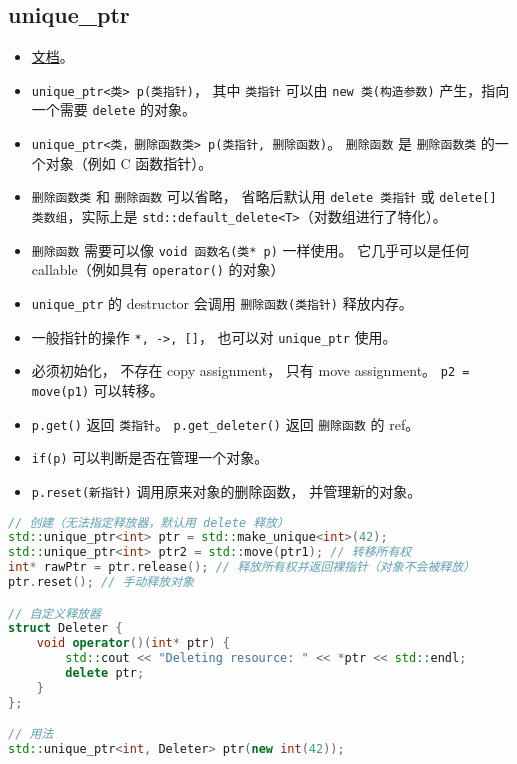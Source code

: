 
\begin{issues}
\issueDraft
\end{issues}

\subsection{unique\_ptr}
\begin{itemize}
\item \href{https://en.cppreference.com/w/cpp/memory/unique_ptr}{文档}。
\item \verb`unique_ptr<类> p(类指针)`， 其中 \verb`类指针` 可以由 \verb`new 类(构造参数)` 产生，指向一个需要 \verb`delete` 的对象。
\item \verb`unique_ptr<类，删除函数类> p(类指针, 删除函数)`。 \verb`删除函数` 是 \verb`删除函数类` 的一个对象（例如 C 函数指针）。
\item \verb`删除函数类` 和 \verb`删除函数` 可以省略， 省略后默认用 \verb`delete 类指针` 或 \verb`delete[] 类数组`，实际上是 \verb`std::default_delete<T>`（对数组进行了特化）。
\item \verb`删除函数` 需要可以像 \verb`void 函数名(类* p)` 一样使用。 它几乎可以是任何 callable（例如具有 \verb`operator()` 的对象）
\item \verb`unique_ptr` 的 destructor 会调用 \verb`删除函数(类指针)` 释放内存。
\item 一般指针的操作 \verb`*, ->, []`， 也可以对 \verb`unique_ptr` 使用。
\item 必须初始化， 不存在 copy assignment， 只有 move assignment。 \verb`p2 = move(p1)` 可以转移。
\item \verb`p.get()` 返回 \verb`类指针`。 \verb`p.get_deleter()` 返回 \verb`删除函数` 的 ref。
\item \verb`if(p)` 可以判断是否在管理一个对象。
\item \verb`p.reset(新指针)` 调用原来对象的删除函数， 并管理新的对象。
\end{itemize}
\begin{lstlisting}[language=cpp]
// 创建（无法指定释放器，默认用 delete 释放）
std::unique_ptr<int> ptr = std::make_unique<int>(42);
std::unique_ptr<int> ptr2 = std::move(ptr1); // 转移所有权
int* rawPtr = ptr.release(); // 释放所有权并返回裸指针（对象不会被释放）
ptr.reset(); // 手动释放对象

// 自定义释放器
struct Deleter {
    void operator()(int* ptr) {
        std::cout << "Deleting resource: " << *ptr << std::endl;
        delete ptr;
    }
};

// 用法
std::unique_ptr<int, Deleter> ptr(new int(42));
\end{lstlisting}


